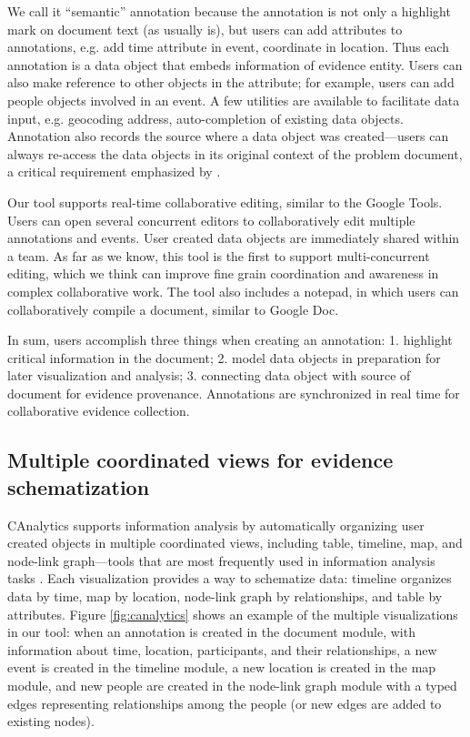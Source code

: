 We call it ``semantic'' annotation because the annotation is not only a highlight mark on document text (as usually is), but users can add attributes to annotations, e.g. add time attribute in event, coordinate in location. Thus each annotation is a data object that embeds information of evidence entity. Users can also make reference to other objects in the attribute; for example, users can add people objects involved in an event. A few utilities are available to facilitate data input, e.g. geocoding address, auto-completion of existing data objects. Annotation also records the source where a data object was created---users can always re-access the data objects in its original context of the problem document, a critical requirement emphasized by \cite{Chin2009}.

Our tool supports real-time collaborative editing, similar to the Google Tools. Users can open several concurrent editors to collaboratively edit multiple annotations and events. User created data objects are immediately shared within a team. As far as we know, this tool is the first to support multi-concurrent editing, which we think can improve fine grain coordination and awareness in complex collaborative work. The tool also includes a notepad, in which users can collaboratively compile a document, similar to Google Doc. 

In sum, users accomplish three things when creating an annotation: 1. highlight critical information in the document; 2. model data objects in preparation for later visualization and analysis; 3. connecting data object with source of document for evidence provenance. Annotations are synchronized in real time for collaborative evidence collection. 
	
\subsection{Multiple coordinated views for evidence schematization}

CAnalytics supports information analysis by automatically organizing user created objects in multiple coordinated views, including table, timeline, map, and node-link graph---tools that are most frequently used in information analysis tasks \cite{Carroll2013}. Each visualization provides a way to schematize data: timeline organizes data by time, map by location, node-link graph by relationships, and table by attributes. Figure \ref{fig:canalytics} shows an example of the multiple visualizations in our tool: when an annotation is created in the document module, with information about time, location, participants, and their relationships, a new event is created in the timeline module, a new location is created in the map module, and new people are created in the node-link graph module with a typed edges representing relationships among the people (or new edges are added to existing nodes). 

